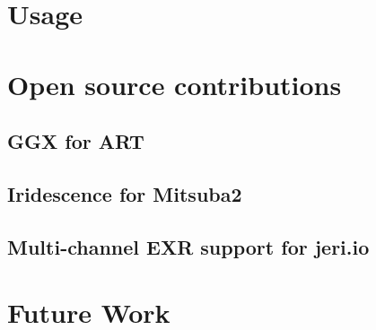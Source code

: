\section{Usage}

\section{Open source contributions}

\subsection{GGX for ART}

\subsection{Iridescence for Mitsuba2}

\subsection{Multi-channel EXR support for jeri.io}

\section{Future Work}
